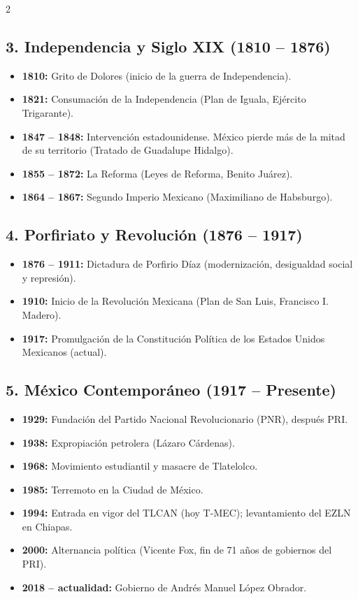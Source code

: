 \documentclass[12pt,a4paper]{article}
\begin{document}
\begin{multicols}{2}
\subsection*{3. Independencia y Siglo XIX (1810 – 1876)}
\begin{itemize}[label=\textbullet]
    \item \textbf{1810:} Grito de Dolores (inicio de la guerra de Independencia).
    \item \textbf{1821:} Consumación de la Independencia (Plan de Iguala, Ejército Trigarante).
    \item \textbf{1847 – 1848:} Intervención estadounidense. México pierde más de la mitad de su territorio (Tratado de Guadalupe Hidalgo).
    \item \textbf{1855 – 1872:} La Reforma (Leyes de Reforma, Benito Juárez).
    \item \textbf{1864 – 1867:} Segundo Imperio Mexicano (Maximiliano de Habsburgo).
\end{itemize}

\subsection*{4. Porfiriato y Revolución (1876 – 1917)}
\begin{itemize}[label=\textbullet]
    \item \textbf{1876 – 1911:} Dictadura de Porfirio Díaz (modernización, desigualdad social y represión).
    \item \textbf{1910:} Inicio de la Revolución Mexicana (Plan de San Luis, Francisco I. Madero).
    \item \textbf{1917:} Promulgación de la Constitución Política de los Estados Unidos Mexicanos (actual).
\end{itemize}

\subsection*{5. México Contemporáneo (1917 – Presente)}
\begin{itemize}[label=\textbullet]
    \item \textbf{1929:} Fundación del Partido Nacional Revolucionario (PNR), después PRI.
    \item \textbf{1938:} Expropiación petrolera (Lázaro Cárdenas).
    \item \textbf{1968:} Movimiento estudiantil y masacre de Tlatelolco.
    \item \textbf{1985:} Terremoto en la Ciudad de México.
    \item \textbf{1994:} Entrada en vigor del TLCAN (hoy T-MEC); levantamiento del EZLN en Chiapas.
    \item \textbf{2000:} Alternancia política (Vicente Fox, fin de 71 años de gobiernos del PRI).
    \item \textbf{2018 – actualidad:} Gobierno de Andrés Manuel López Obrador.
\end{itemize}

\end{multicols}
\end{document}
